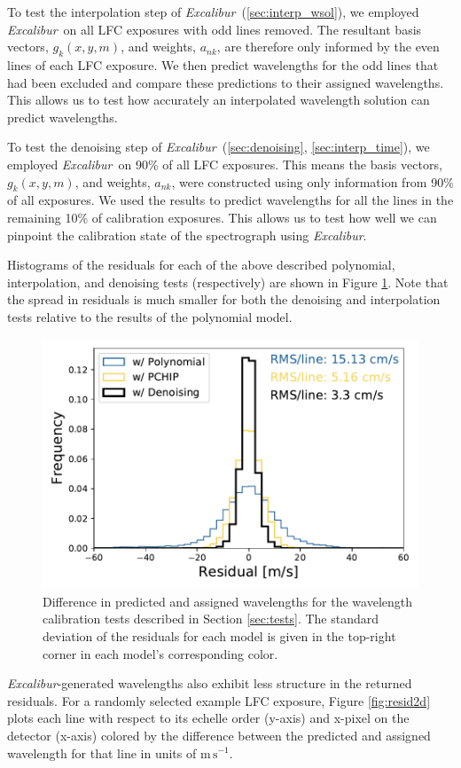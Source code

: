 \documentclass[twocolumn]{aastex63}
\newcommand{\project}[1]{\textsl{#1}}
\newcommand{\name}{\project{Excalibur}}
\newcommand{\mps}{\mathrm{m\,s^{-1}}}
\begin{document}
To test the interpolation step of \name\ (\textsection \ref{sec:interp_wsol}), we employed \name\ on all LFC exposures with odd lines removed.  The resultant basis vectors, $g_k(x,y,m)$,  and weights, $a_{nk}$, are therefore only informed by the even lines of each LFC exposure.  We then predict wavelengths for the odd lines that had been excluded and compare these predictions to their assigned wavelengths.  This allows us to test how accurately an interpolated wavelength solution can predict wavelengths.

To test the denoising step of \name\ (\textsection \ref{sec:denoising}, \textsection\ref{sec:interp_time}), we employed \name\ on 90\% of all LFC exposures.  This means the basis vectors, $g_k(x,y,m)$,  and weights, $a_{nk}$, were constructed using only information from 90\% of all exposures.  We used the results to predict wavelengths for all the lines in the remaining 10\% of calibration exposures.  This allows us to test how well we can pinpoint the calibration state of the spectrograph using \name.

Histograms of the residuals for each of the above described polynomial, interpolation, and denoising tests (respectively) are shown in Figure \ref{fig:testHists}.  Note that the spread in residuals is much smaller for both the denoising and interpolation tests relative to the results of the polynomial model.

\begin{figure}[h]
\centering
\includegraphics[width=.5\textwidth]{Figures/all_results.pdf}
\caption{Difference in predicted and assigned wavelengths for the wavelength calibration tests described in Section \ref{sec:tests}.  The standard deviation of the residuals for each model is given in the top-right corner in each model's corresponding color.}
\label{fig:testHists}
\end{figure} 

\name -generated wavelengths also exhibit less structure in the returned residuals.  For a randomly selected example LFC exposure, Figure \ref{fig:resid2d} plots each line with respect to its echelle order (y-axis) and x-pixel on the detector (x-axis) colored by the difference between the predicted and assigned wavelength for that line in units of $\mps$.
\end{document}
